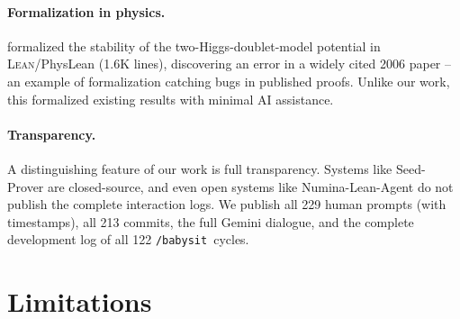 \documentclass[11pt]{article}
\newcommand{\lean}{\textsc{Lean}}
\newcommand{\babysit}{\texttt{/babysit}}
\begin{document}
\paragraph{Formalization in physics.}
\citet{toobysmith2026} formalized the stability of the two-Higgs-doublet-model potential in \lean/PhysLean (1.6K lines), discovering an error in a widely cited 2006 paper -- an example of formalization catching bugs in published proofs. Unlike our work, this formalized existing results with minimal AI assistance.

\paragraph{Transparency.}
A distinguishing feature of our work is full transparency. Systems like Seed-Prover \citep{seedprover2025} are closed-source, and even open systems like Numina-Lean-Agent \citep{numina2025} do not publish the complete interaction logs. We publish all 229 human prompts (with timestamps), all 213 commits, the full Gemini dialogue, and the complete development log of all 122 \babysit\ cycles.

\section{Limitations}
\label{sec:limitations}
\end{document}
